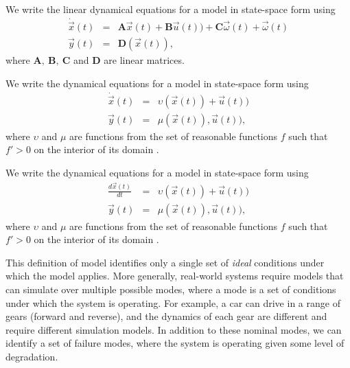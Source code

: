 \begin{definition}
We write the linear dynamical equations for a model in state-space form using
\begin{eqnarray}\label{linear-model}
\dot{\vec{x}}(t) & = & \mathbf{A} \vec{x}(t) + \mathbf{B} \vec{u}(t)) + \mathbf{C} \vec{\omega}(t) +  \vec{\omega}(t)\\
\vec{y}(t) & = & \mathbf{D} (\vec{x}(t)),
\end{eqnarray}
where $\mathbf{A}, ~ \mathbf{B},~\mathbf{C}$ and $\mathbf{D}$ are linear matrices.
\end{definition}

\begin{definition}
We write the dynamical equations for a model in state-space form using
\begin{eqnarray}\label{qual-model}
\dot{\vec{x}}(t) & = & \upsilon (\vec{x}(t)) + \vec{u}(t))\\
\vec{y}(t) & = & \mu (\vec{x}(t)), \vec{u}(t)),
\end{eqnarray}
where $\upsilon$ and $\mu$ are  functions from the set of reasonable functions $f$ such that $f' > 0$ on the interior of its domain \citep{kuipers1994composition}.
\end{definition}

\begin{definition}
We write the dynamical equations for a model in state-space form using
\begin{eqnarray}\label{boolean-model}
\frac{d \vec{x}(t)}{dt} & = & \upsilon (\vec{x}(t)) + \vec{u}(t))\\
\vec{y}(t) & = & \mu (\vec{x}(t)), \vec{u}(t)),
\end{eqnarray}
where $\upsilon$ and $\mu$ are  functions from the set of reasonable functions $f$ such that $f' > 0$ on the interior of its domain \citep{kuipers1994composition}.
\end{definition}

This definition of model identifies only a single set of \textit{ideal} conditions under which the model applies. More generally, real-world systems require models that can simulate over multiple possible modes, where a mode is a set of conditions under which the system is operating. For example, a car can drive in a range of gears (forward and reverse), and the dynamics of each gear are different and require different simulation models. In addition to these nominal modes, we can identify a set of failure modes, where the system is operating given some level of degradation. 

